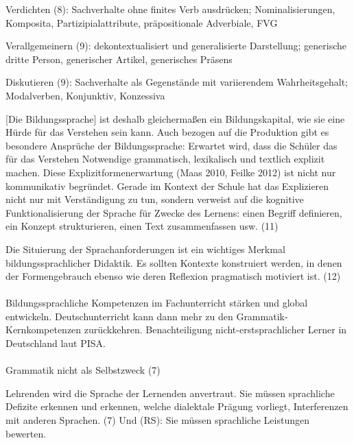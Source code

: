 Verdichten (8): Sachverhalte ohne finites Verb ausdrücken; Nominalisierungen, Komposita, Partizipialattribute, präpositionale Adverbiale, FVG

Verallgemeinern (9): dekontextualisiert und generalisierte Darstellung; generische dritte Person, generischer Artikel, generisches Präsens

Diskutieren (9): Sachverhalte als Gegenstände mit variierendem Wahrheitsgehalt; Modalverben, Konjunktiv, Konzessiva

[Die Bildungssprache] ist deshalb gleichermaßen ein Bildungskapital, wie sie eine Hürde für das Verstehen sein kann. Auch bezogen auf die Produktion gibt es besondere Ansprüche der Bildungssprache: Erwartet wird, dass die Schüler das für das Verstehen Notwendige grammatisch, lexikalisch und textlich explizit machen. Diese Explizitformenerwartung (Maas 2010, Feilke 2012) ist nicht nur kommunikativ begründet. Gerade im Kontext der Schule hat das Explizieren nicht nur mit Verständigung zu tun, sondern verweist auf die kognitive Funktionalisierung der Sprache für Zwecke des Lernens: einen Begriff definieren, ein Konzept strukturieren, einen Text zusammenfassen usw. (11)

Die Situierung der Sprachanforderungen ist ein wichtiges Merkmal bildungssprachlicher Didaktik. Es sollten Kontexte konstruiert werden, in denen der Formengebrauch ebenso wie deren Reflexion pragmatisch motiviert ist. (12)

\paragraph*{\citet{Schroeterbrauss2013}}

Bildungssprachliche Kompetenzen im Fachunterricht stärken und global entwickeln.
Deutschunterricht kann dann mehr zu den Grammatik-Kernkompetenzen zurückkehren.
Benachteiligung nicht-erstsprachlicher Lerner in Deutschland laut PISA.

\paragraph*{\citet{Eisenberg2013c}}

Grammatik nicht als Selbstzweck (7)

Lehrenden wird die Sprache der Lernenden anvertraut.
Sie müssen sprachliche Defizite erkennen und erkennen, welche dialektale Prägung vorliegt, Interferenzen mit anderen Sprachen. (7) Und (RS): Sie müssen sprachliche Leistungen bewerten.

